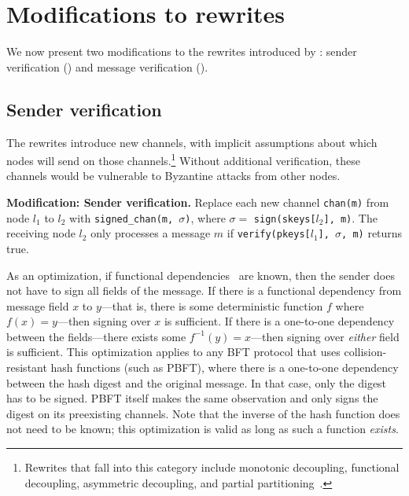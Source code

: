 \section{Modifications to rewrites}
\label{sec:modifications-to-rewrites}

We now present two modifications to the rewrites introduced by \sigmodpaper{}: sender verification () and message verification ().

\subsection{Sender verification}
\label{sec:sender-verification}
The rewrites introduce new channels, with implicit assumptions about which nodes will send on those channels.\footnote{Rewrites that fall into this category include monotonic decoupling, functional decoupling, asymmetric decoupling, and partial partitioning~\cite{autocomp,autocompTechReport}.}
Without additional verification, these channels would be vulnerable to Byzantine attacks from other nodes.

\textbf{Modification: Sender verification.}
Replace each new channel \texttt{chan(m)} from node $l_1$ to $l_2$ with \texttt{signed\_chan(m, $\sigma$)}, where $\sigma =$ \texttt{sign(skeys[$l_2$], m)}.
The receiving node $l_2$ only processes a message $m$ if \texttt{verify(pkeys[$l_1$], $\sigma$, m)} returns true.

As an optimization, if functional dependencies~\cite{autocomp,alice} are known, then the sender does not have to sign all fields of the message.
If there is a functional dependency from message field $x$ to $y$---that is, there is some deterministic function $f$ where $f(x) = y$---then signing over $x$ is sufficient.
If there is a one-to-one dependency between the fields---there exists some $f^{-1}(y) = x$---then signing over \emph{either} field is sufficient.
This optimization applies to any BFT protocol that uses collision-resistant hash functions (such as PBFT), where there is a one-to-one dependency between the hash digest and the original message.
In that case, only the digest has to be signed.
PBFT itself makes the same observation and only signs the digest on its preexisting channels.
Note that the inverse of the hash function does not need to be known; this optimization is valid as long as such a function \emph{exists}.

